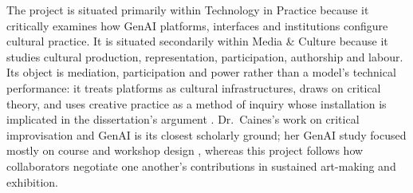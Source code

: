 The project is situated primarily within Technology in Practice because it
critically examines how GenAI platforms, interfaces and institutions
configure cultural practice. It is situated secondarily within Media \&
Culture because it studies cultural production, representation,
participation, authorship and labour. Its object is mediation, participation and
power rather than a model's technical performance: it treats platforms as
cultural infrastructures, draws on critical theory, and uses creative
practice as a method of inquiry whose installation is implicated in the
dissertation's argument \citep{comcult_rc}. Dr.\ Caines's work on critical improvisation and
GenAI is its closest scholarly ground; her GenAI study focused mostly on course and workshop
design \citep[176]{caines2026steaming}, whereas this project follows how
collaborators negotiate one another's contributions in sustained art-making
and exhibition.
